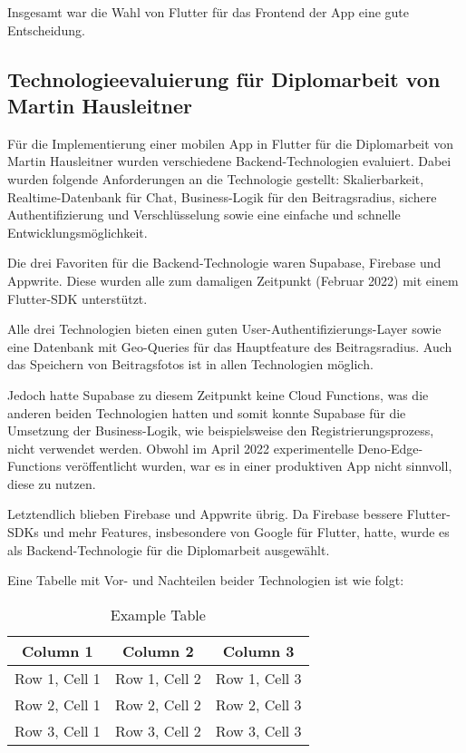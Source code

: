 Insgesamt war die Wahl von Flutter für das Frontend der App eine gute Entscheidung.

\subsection
{Technologieevaluierung für Diplomarbeit von Martin Hausleitner}

Für die Implementierung einer mobilen App in Flutter für die Diplomarbeit von Martin Hausleitner wurden verschiedene Backend-Technologien evaluiert. Dabei wurden folgende Anforderungen an die Technologie gestellt: Skalierbarkeit, Realtime-Datenbank für Chat, Business-Logik für den Beitragsradius, sichere Authentifizierung und Verschlüsselung sowie eine einfache und schnelle Entwicklungsmöglichkeit.

Die drei Favoriten für die Backend-Technologie waren Supabase, Firebase und Appwrite. Diese wurden alle zum damaligen Zeitpunkt (Februar 2022) mit einem Flutter-SDK unterstützt.

Alle drei Technologien bieten einen guten User-Authentifizierungs-Layer sowie eine Datenbank mit Geo-Queries für das Hauptfeature des Beitragsradius. Auch das Speichern von Beitragsfotos ist in allen Technologien möglich.

Jedoch hatte Supabase zu diesem Zeitpunkt keine Cloud Functions, was die anderen beiden Technologien hatten und somit konnte Supabase für die Umsetzung der Business-Logik, wie beispielsweise den Registrierungsprozess, nicht verwendet werden. Obwohl im April 2022 experimentelle Deno-Edge-Functions veröffentlicht wurden, war es in einer produktiven App nicht sinnvoll, diese zu nutzen.

Letztendlich blieben Firebase und Appwrite übrig. Da Firebase bessere Flutter-SDKs und mehr Features, insbesondere von Google für Flutter, hatte, wurde es als Backend-Technologie für die Diplomarbeit ausgewählt.

Eine Tabelle mit Vor- und Nachteilen beider Technologien ist wie folgt:

\begin{table}
    \centering
    \begin{tabular}{|c|c|c|}
        \hline
        \textbf{Column 1} & \textbf{Column 2} & \textbf{Column 3} \\ \hline
        Row 1, Cell 1     & Row 1, Cell 2     & Row 1, Cell 3     \\ \hline
        Row 2, Cell 1     & Row 2, Cell 2     & Row 2, Cell 3     \\ \hline
        Row 3, Cell 1     & Row 3, Cell 2     & Row 3, Cell 3     \\ \hline
    \end{tabular}
    \caption{Example Table}
    \label{tab:example}
\end{table}


